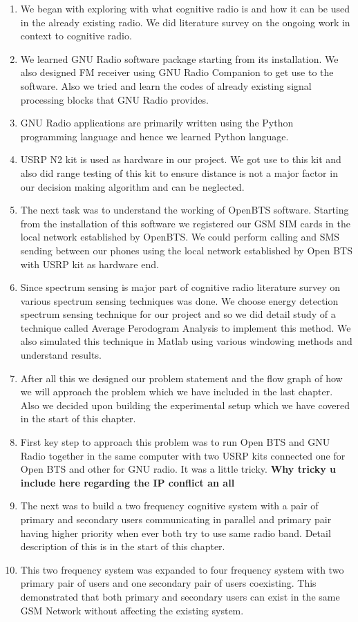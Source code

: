 \begin{enumerate}

\item We began with exploring with what cognitive radio is and how it can be used 
in the already existing radio. We did literature survey on the ongoing work in 
context to cognitive radio. 
\item We learned GNU Radio software package starting from its installation. We 
also designed FM receiver using GNU Radio Companion to get use to the software. 
Also we tried and learn the codes of already existing signal processing blocks 
that GNU Radio provides.
\item GNU Radio applications are primarily written using the Python programming 
language and hence we learned Python language.
\item USRP N2 kit is used as hardware in our project. We got use to this kit and 
also did range testing of this kit to ensure distance is not a major factor in 
our decision making algorithm and can be neglected.
\item The next task was to understand the working of OpenBTS software. Starting 
from the installation of this software we registered our GSM SIM cards in the 
local network established by OpenBTS. We could perform calling and SMS sending 
between our phones using the local network established by Open BTS with USRP 
kit as hardware end.
\item Since spectrum sensing is major part of cognitive radio literature survey 
on various spectrum sensing techniques was done. We choose energy detection 
spectrum sensing technique for our project and so we did detail study of a 
technique called Average Perodogram Analysis to implement this method. We also 
simulated this technique in Matlab using various windowing methods and 
understand results. 
\item After all this we designed our problem statement and the flow graph of 
how we will approach the problem which we have included in the last chapter. 
Also we decided upon building the experimental setup which we have covered in 
the start of this chapter. 
\item  First key step to approach this problem was to run Open BTS and GNU 
Radio together in the same computer with two USRP kits connected one for Open 
BTS and other for GNU radio. It was a little tricky. \textbf{Why tricky u 
include here regarding the IP conflict an all}
\item The next was to build a two frequency cognitive system with a pair of 
primary and secondary users communicating in parallel and primary pair having 
higher priority when ever both try to use same radio band. Detail description 
of this is in the start of this chapter.
\item This two frequency system was expanded to four frequency system with two 
primary pair of users and one secondary pair of users coexisting. This 
demonstrated that both primary and secondary users can exist in the same GSM 
Network without affecting the existing system.
\end{enumerate}